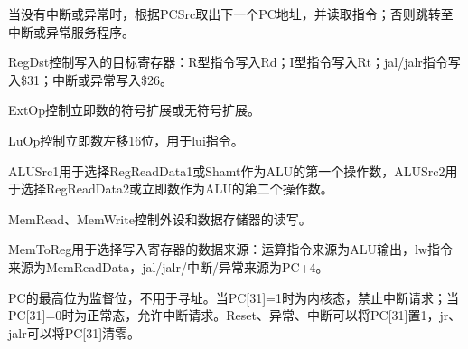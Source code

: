 \documentclass{article}
\begin{document}
            \begin{enumerate}
                \begin{item}
                    当没有中断或异常时，根据PCSrc取出下一个PC地址，并读取指令；否则跳转至中断或异常服务程序。
                \end{item}
                \begin{item}
                    RegDst控制写入的目标寄存器：R型指令写入Rd；I型指令写入Rt；jal/jalr指令写入\$31；中断或异常写入\$26。
                \end{item}
                \begin{item}
                    ExtOp控制立即数的符号扩展或无符号扩展。
                \end{item}
                \begin{item}
                    LuOp控制立即数左移16位，用于lui指令。
                \end{item}
                \begin{item}
                    ALUSrc1用于选择RegReadData1或Shamt作为ALU的第一个操作数，ALUSrc2用于选择RegReadData2或立即数作为ALU的第二个操作数。
                \end{item}
                \begin{item}
                    MemRead、MemWrite控制外设和数据存储器的读写。
                \end{item}
                \begin{item}
                    MemToReg用于选择写入寄存器的数据来源：运算指令来源为ALU输出，lw指令来源为MemReadData，jal/jalr/中断/异常来源为PC+4。
                \end{item}
                \begin{item}
                    PC的最高位为监督位，不用于寻址。当PC[31]=1时为内核态，禁止中断请求；当PC[31]=0时为正常态，允许中断请求。Reset、异常、中断可以将PC[31]置1，jr、jalr可以将PC[31]清零。
                \end{item}
            \end{enumerate}
\end{document}
